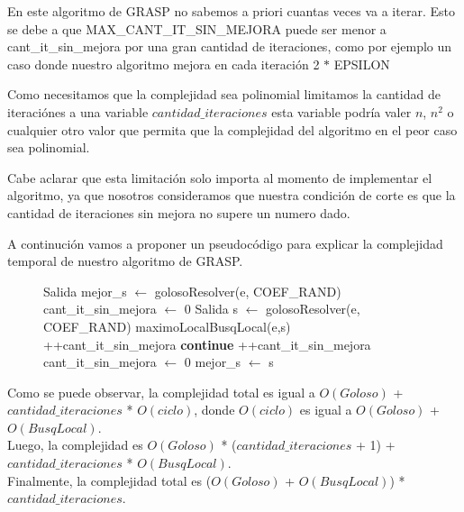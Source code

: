En este algoritmo de GRASP no sabemos a priori cuantas veces va a iterar. Esto se debe a que MAX\_CANT\_IT\_SIN\_MEJORA puede ser menor a cant\_it\_sin\_mejora por una gran cantidad de iteraciones, como por ejemplo un caso donde nuestro algoritmo mejora en cada iteración 2 $*$ EPSILON

Como necesitamos que la complejidad sea polinomial limitamos la cantidad de iteraciónes a una variable $cantidad\_iteraciones$ esta variable podría valer $n$, $n^2$ o cualquier otro valor que permita que la complejidad del algoritmo en el peor caso sea polinomial.

Cabe aclarar que esta limitación solo importa al momento de implementar el algoritmo, ya que nosotros consideramos que nuestra condición de corte es que la cantidad de iteraciones sin mejora no supere un numero dado.

A continución vamos a proponer un pseudocódigo para explicar la complejidad temporal de nuestro algoritmo de GRASP.

\begin{center}
 \begin{figure}[H]
  \begin{pseudo}
    \State Salida mejor\_s $\leftarrow$ golosoResolver(e, COEF\_RAND) 
    \State cant\_it\_sin\_mejora $\leftarrow$ 0 
      \State Salida s $\leftarrow$ golosoResolver(e, COEF\_RAND) 
      \State maximoLocalBusqLocal(e,s) 
       
	\State++cant\_it\_sin\_mejora 
	\State \textbf{continue}
      \EndIf
       
	\State ++cant\_it\_sin\_mejora 
      \Else
	\State cant\_it\_sin\_mejora $\leftarrow$ 0 
      \EndIf
       
	\State mejor\_s $\leftarrow$ s 
      \EndIf
    \EndWhile
    \EndProcedure
  \end{pseudo}
 \end{figure}
\end{center}

Como se puede observar, la complejidad total es igual a $O(Goloso)$ + $cantidad\_iteraciones$ * $O(ciclo)$, donde $O(ciclo)$ es igual a  $O(Goloso)$ + $O(BusqLocal)$.\\
Luego, la complejidad es $O(Goloso)$ * ($cantidad\_iteraciones$ + 1) + $cantidad\_iteraciones$ * $O(BusqLocal)$.\\
Finalmente, la complejidad total es ($O(Goloso)$ + $O(BusqLocal)$) * $cantidad\_iteraciones$.